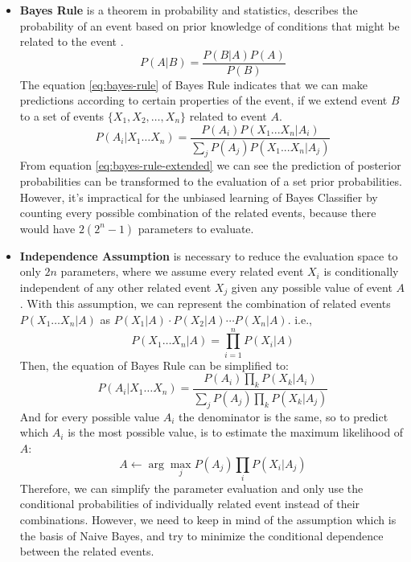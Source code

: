 \documentclass{article}
\begin{document}
\begin{itemize}
	\item \textbf{Bayes Rule} is a theorem in probability and statistics, describes the probability of an event based on prior knowledge of conditions that might be related to the event  \cite{bayes-rule}. 
	\begin{equation} \label{eq:bayes-rule}
		P(A|B)=\frac{P(B|A)P(A)}{P(B)}
	\end{equation}
	The equation \ref{eq:bayes-rule} of Bayes Rule indicates that we can make predictions according to certain properties of the event, if we extend event $B$ to a set of events $\{X_1, X_2, \ldots, X_n\}$ related to event $A$.
	\begin{equation} \label{eq:bayes-rule-extended}
		P(A_i|{X_1 \ldots X_n})=\frac{P(A_i)P(X_1...X_n|A_i)}{\sum_j{P(A_j)P(X_1...X_n|A_j)}}
	\end{equation}
	From equation \ref{eq:bayes-rule-extended} we can see the prediction of posterior probabilities can be transformed to the evaluation of a set prior probabilities. However, it's impractical for the unbiased learning of Bayes Classifier by counting every possible combination of the related events, because there would have $2(2^n-1)$ parameters to evaluate.
	\item \textbf{Independence Assumption} is necessary to reduce the evaluation space to only $2n$ parameters, where we assume every related event $X_i$ is conditionally independent of any other related event $X_j$ given any possible value of event $A$. With this assumption, we can represent the combination of related events $P(X_1 \ldots X_n|A)$ as $P(X_1|A)\cdot P(X_2|A) \cdots P(X_n|A)$. i.e.,
	\begin{equation} \label{eq:independence-product}
		P(X_1 \ldots X_n|A)=\prod_{i=1}^{n}{P(X_i|A)}
	\end{equation}
	Then, the equation of Bayes Rule can be simplified to:
	\begin{equation} \label{eq:naive-bayes}
		P(A_i|{X_1 \ldots X_n})=\frac{P(A_i)\prod_{k}{P(X_k|A_i)}}{\sum_j{P(A_j)\prod_{k}{P(X_k|A_j)}}}
	\end{equation}
	And for every possible value $A_i$ the denominator is the same, so to predict which $A_i$ is the most possible value, is to estimate the maximum likelihood of $A$:
	\begin{equation} \label{eq:naive-bayes}
		A \leftarrow \arg\max_{j} {P(A_j)\prod_{i}{P(X_i|A_j)}}
	\end{equation}
	Therefore, we can simplify the parameter evaluation and only use the conditional probabilities of individually related event instead of their combinations. However, we need to keep in mind of the assumption which is the basis of Naive Bayes, and try to minimize the conditional dependence between the related events.
\end{itemize}
\end{document}

